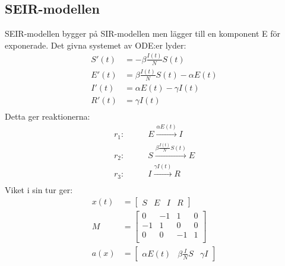 \documentclass[11pt,a4paper]{article}
\begin{document}
\subsection{SEIR-modellen}
SEIR-modellen bygger på SIR-modellen men lägger till en komponent E för exponerade.
Det givna systemet av ODE:er lyder:
\begin{align*}
    S'(t) & = -\beta \frac{I(t)}{N} S(t)              \\
    E'(t) & = \beta \frac{I(t)}{N} S(t) - \alpha E(t) \\
    I'(t) & = \alpha E(t) - \gamma I(t)               \\
    R'(t) & = \gamma I(t)                             \\
\end{align*}
Detta ger reaktionerna:
\begin{align*}
    r_1: \qquad & E \xrightarrow{\alpha E(t)} I               \\
    r_2: \qquad & S \xrightarrow{\beta \frac{I(t)}{N} S(t)} E \\
    r_3: \qquad & I \xrightarrow{\gamma I(t)} R               \\
\end{align*}
Viket i sin tur ger:
\begin{align*}
    x(t) & = \begin{bmatrix} S & E & I & R \end{bmatrix}                                \\
    M    & = \begin{bmatrix}
                 0  & -1 & 1  & 0 \\
                 -1 & 1  & 0  & 0 \\
                 0  & 0  & -1 & 1 \\
             \end{bmatrix}                                                           \\
    a(x) & = \begin{bmatrix} \alpha E(t) & \beta \frac{I}{N} S & \gamma I \end{bmatrix} \\
\end{align*}
\end{document}
